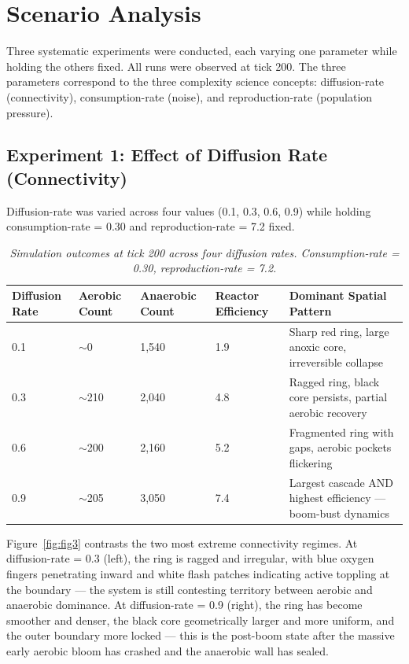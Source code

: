 \documentclass[12pt]{article}
\begin{document}
\section{Scenario Analysis}

Three systematic experiments were conducted, each varying one parameter while holding the others fixed. All runs were observed at tick 200. The three parameters correspond to the three complexity science concepts: diffusion-rate (connectivity), consumption-rate (noise), and reproduction-rate (population pressure).

\subsection{Experiment 1: Effect of Diffusion Rate (Connectivity)}

Diffusion-rate was varied across four values (0.1, 0.3, 0.6, 0.9) while holding consumption-rate = 0.30 and reproduction-rate = 7.2 fixed.

\begin{table}[H]
  \centering
  \caption{\textit{Simulation outcomes at tick 200 across four diffusion rates. Consumption-rate = 0.30, reproduction-rate = 7.2.}}
  \label{tab:table1}
  \small
  \begin{tabular}{|p{1.5cm}|p{1.5cm}|p{1.7cm}|p{1.7cm}|p{5cm}|}
    \hline
    \textbf{Diffusion Rate} & \textbf{Aerobic Count} & \textbf{Anaerobic Count} & \textbf{Reactor Efficiency} & \textbf{Dominant Spatial Pattern} \\
    \hline
    0.1 & $\sim$0 & 1,540 & 1.9 & Sharp red ring, large anoxic core, irreversible collapse \\
    \hline
    0.3 & $\sim$210 & 2,040 & 4.8 & Ragged ring, black core persists, partial aerobic recovery \\
    \hline
    0.6 & $\sim$200 & 2,160 & 5.2 & Fragmented ring with gaps, aerobic pockets flickering \\
    \hline
    0.9 & $\sim$205 & 3,050 & 7.4 & Largest cascade AND highest efficiency --- boom-bust dynamics \\
    \hline
  \end{tabular}
\end{table}

Figure~\ref{fig:fig3} contrasts the two most extreme connectivity regimes. At diffusion-rate = 0.3 (left), the ring is ragged and irregular, with blue oxygen fingers penetrating inward and white flash patches indicating active toppling at the boundary --- the system is still contesting territory between aerobic and anaerobic dominance. At diffusion-rate = 0.9 (right), the ring has become smoother and denser, the black core geometrically larger and more uniform, and the outer boundary more locked --- this is the post-boom state after the massive early aerobic bloom has crashed and the anaerobic wall has sealed.
\end{document}
